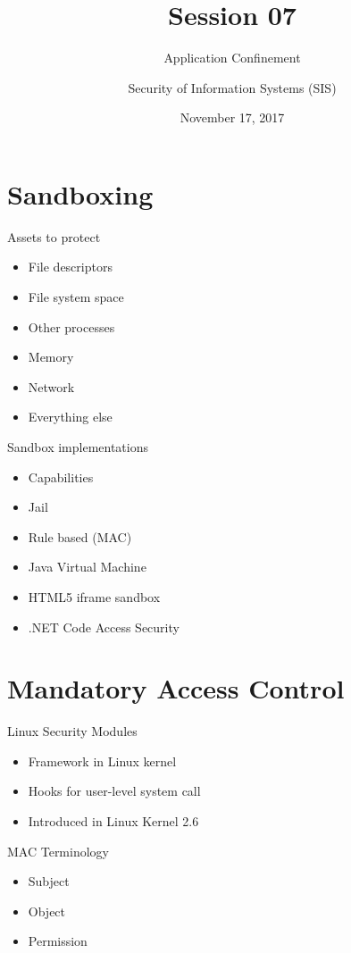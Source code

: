 \documentclass{curs}
\title[Session 07]{Session 07}
\subtitle{Application Confinement}
\author{Security of Information Systems (SIS)}
\date{November 17, 2017}
\begin{document}
\frame{\titlepage}

\section{Sandboxing}

\begin{frame}{Assets to protect}
  \begin{itemize}
    \item File descriptors
    \item File system space
    \item Other processes 
    \item Memory
    \item Network
    \item Everything else
  \end{itemize}
\end{frame}

\begin{frame}{Sandbox implementations}
  \begin{itemize}
    \item Capabilities
    \item Jail
    \item Rule based (MAC)
    \item Java Virtual Machine
    \item HTML5 iframe sandbox
    \item .NET Code Access Security
  \end{itemize}
\end{frame}

\section{Mandatory Access Control}

\begin{frame}{Linux Security Modules}
  \begin{itemize}
    \item Framework in Linux kernel
    \item Hooks for user-level system call
    \item Introduced in Linux Kernel 2.6
  \end{itemize}
\end{frame}

\begin{frame}{MAC Terminology}
  \begin{itemize}
    \item Subject
    \item Object
    \item Permission
  \end{itemize}
\end{frame}
\end{document}

